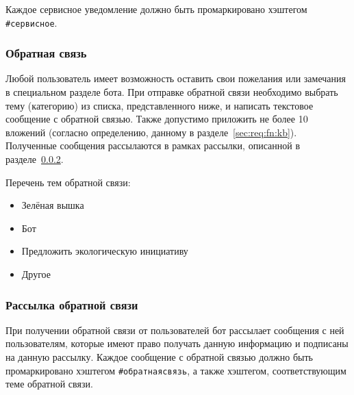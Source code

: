         Каждое сервисное уведомление должно быть промаркировано хэштегом \hbox{\texttt{\#сервисное}}.

    \subsubsection{Обратная связь}
        \label{sec:req:fn:feedback}
        Любой пользователь имеет возможность оставить свои пожелания или замечания в специальном
        разделе бота. При отправке обратной связи необходимо выбрать тему (категорию) из списка,
        представленного ниже, и написать текстовое сообщение с обратной связью.
        Также допустимо приложить не более 10 вложений (согласно определению, данному в
        разделе~\ref{sec:req:fn:kb}). Полученные сообщения рассылаются в рамках рассылки,
        описанной в разделе~\ref{sec:req:fn:feedbacknl}.

        Перечень тем обратной связи:
        \begin{itemize}
            \item
                Зелёная вышка
            \item
                Бот
            \item
                Предложить экологическую инициативу
            \item
                Другое
        \end{itemize}

    \subsubsection{Рассылка обратной связи}
        \label{sec:req:fn:feedbacknl}
        При получении обратной связи от пользователей бот рассылает сообщения с ней пользователям,
        которые имеют право получать данную информацию и подписаны на данную рассылку.
        Каждое сообщение с обратной связью должно быть промаркировано хэштегом \hbox{\texttt{\#обратнаясвязь}},
        а также хэштегом, соответствующим теме обратной связи.

